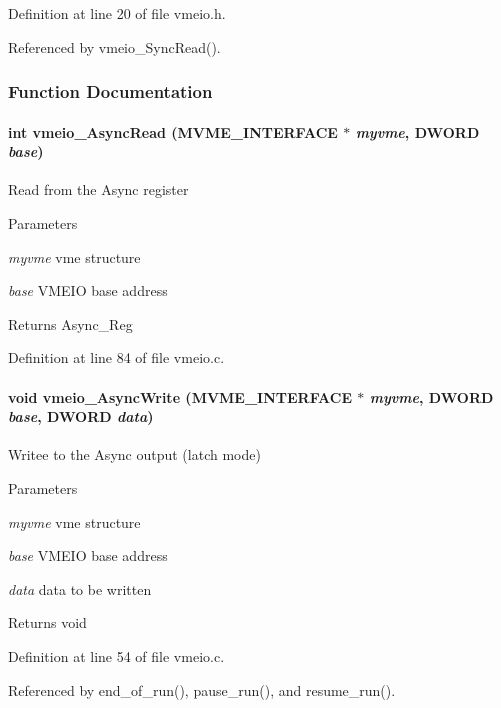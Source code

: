 Definition at line 20 of file vmeio.h.

Referenced by vmeio\_\-SyncRead().

\subsubsection{Function Documentation}
\paragraph[{vmeio\_\-AsyncRead}]{\setlength{\rightskip}{0pt plus 5cm}int vmeio\_\-AsyncRead ({\bf MVME\_\-INTERFACE} $\ast$ {\em myvme}, \/  {\bf DWORD} {\em base})}\hfill\label{vmeio_8h_a430d0ca0a0601d0f445fbc4e12f13af5}
Read from the Async register 
\begin{DoxyParams}{Parameters}
\item[{\em myvme}]vme structure \item[{\em base}]VMEIO base address \end{DoxyParams}
\begin{DoxyReturn}{Returns}
Async\_\-Reg 
\end{DoxyReturn}


Definition at line 84 of file vmeio.c.
\paragraph[{vmeio\_\-AsyncWrite}]{\setlength{\rightskip}{0pt plus 5cm}void vmeio\_\-AsyncWrite ({\bf MVME\_\-INTERFACE} $\ast$ {\em myvme}, \/  {\bf DWORD} {\em base}, \/  {\bf DWORD} {\em data})}\hfill\label{vmeio_8h_a4e36c63f5bead10c1b534d26b3775662}
Writee to the Async output (latch mode) 
\begin{DoxyParams}{Parameters}
\item[{\em myvme}]vme structure \item[{\em base}]VMEIO base address \item[{\em data}]data to be written \end{DoxyParams}
\begin{DoxyReturn}{Returns}
void 
\end{DoxyReturn}


Definition at line 54 of file vmeio.c.

Referenced by end\_\-of\_\-run(), pause\_\-run(), and resume\_\-run().
